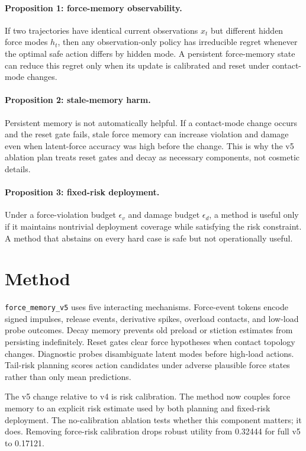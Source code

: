 \documentclass{article}
\newcommand{\method}[1]{\texttt{#1}}
\begin{document}
\paragraph{Proposition 1: force-memory observability.}
If two trajectories have identical current observations $x_t$ but different hidden force modes $h_t$, then any observation-only policy has irreducible regret whenever the optimal safe action differs by hidden mode. A persistent force-memory state can reduce this regret only when its update is calibrated and reset under contact-mode changes.

\paragraph{Proposition 2: stale-memory harm.}
Persistent memory is not automatically helpful. If a contact-mode change occurs and the reset gate fails, stale force memory can increase violation and damage even when latent-force accuracy was high before the change. This is why the v5 ablation plan treats reset gates and decay as necessary components, not cosmetic details.

\paragraph{Proposition 3: fixed-risk deployment.}
Under a force-violation budget $\epsilon_v$ and damage budget $\epsilon_d$, a method is useful only if it maintains nontrivial deployment coverage while satisfying the risk constraint. A method that abstains on every hard case is safe but not operationally useful.

\section{Method}
\method{force\_memory\_v5} uses five interacting mechanisms. Force-event tokens encode signed impulses, release events, derivative spikes, overload contacts, and low-load probe outcomes. Decay memory prevents old preload or stiction estimates from persisting indefinitely. Reset gates clear force hypotheses when contact topology changes. Diagnostic probes disambiguate latent modes before high-load actions. Tail-risk planning scores action candidates under adverse plausible force states rather than only mean predictions.

The v5 change relative to v4 is risk calibration. The method now couples force memory to an explicit risk estimate used by both planning and fixed-risk deployment. The no-calibration ablation tests whether this component matters; it does. Removing force-risk calibration drops robust utility from 0.32444 for full v5 to 0.17121.
\end{document}
